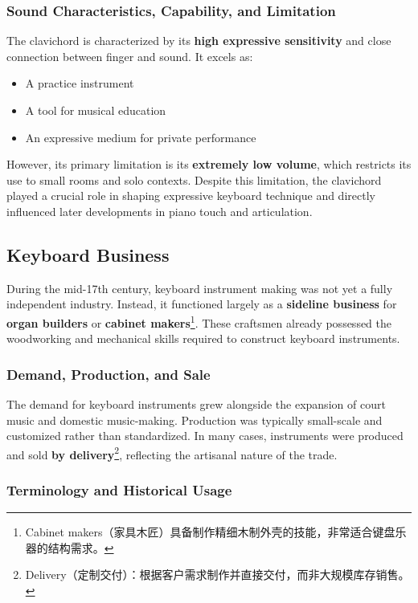 \documentclass[math,code]{amznotes}
\theoremstyle{remark}
\begin{document}
\subsubsection{Sound Characteristics, Capability, and Limitation}

The clavichord is characterized by its \textbf{high expressive sensitivity} and close connection between finger and sound.
It excels as:
\begin{itemize}
    \item A practice instrument
    \item A tool for musical education
    \item An expressive medium for private performance
\end{itemize}

However, its primary limitation is its \textbf{extremely low volume}, which restricts its use to small rooms and solo contexts. Despite this limitation, the clavichord played a crucial role in shaping expressive keyboard technique and directly influenced later developments in piano touch and articulation.

\subsection{Keyboard Business}

During the mid-17th century, keyboard instrument making was not yet a fully independent industry.
Instead, it functioned largely as a \textbf{sideline business} for \textbf{organ builders} or \textbf{cabinet makers}\footnote{Cabinet makers（家具木匠）具备制作精细木制外壳的技能，非常适合键盘乐器的结构需求。}.
These craftsmen already possessed the woodworking and mechanical skills required to construct keyboard instruments.

\subsubsection{Demand, Production, and Sale}

The demand for keyboard instruments grew alongside the expansion of court music and domestic music-making.
Production was typically small-scale and customized rather than standardized.
In many cases, instruments were produced and sold \textbf{by delivery}\footnote{Delivery（定制交付）：根据客户需求制作并直接交付，而非大规模库存销售。}, reflecting the artisanal nature of the trade.

\subsubsection{Terminology and Historical Usage}
\end{document}
